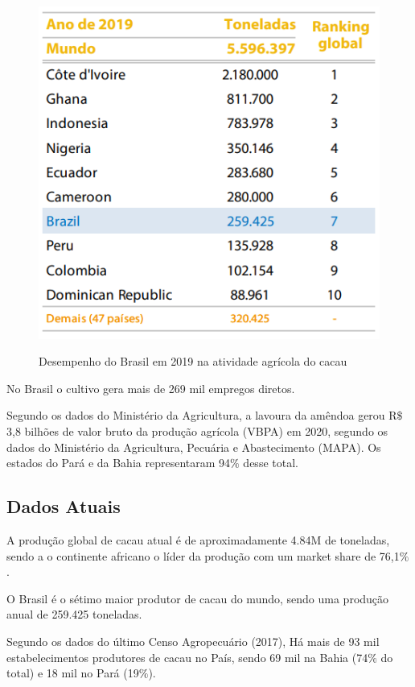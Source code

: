 \documentclass[
	12pt,				%
	openright,			%
	oneside,			%
	a4paper,			%
	english,			%
	french,				%
	spanish,			%
	brazil				%
	]{abntex2}
\begin{document}
\begin{figure}[H]
\begin{center}
\caption{Desempenho do Brasil em 2019 na atividade agrícola do cacau}
\includegraphics[scale=0.8]{../../Pictures/tabela.png} 
\label{fig2}
\end{center}
\end{figure}

No Brasil o cultivo gera mais de 269 mil empregos diretos.

Segundo os dados do Ministério da Agricultura, a lavoura da amêndoa gerou R$\$$ 3,8 bilhões de valor bruto da produção agrícola (VBPA) em 2020, segundo os dados do Ministério da Agricultura, Pecuária e Abastecimento (MAPA). Os estados do Pará e da Bahia representaram 94$\%$ desse total. \cite{8}

\subsection{Dados Atuais}

A produção global de cacau atual é de aproximadamente 4.84M de toneladas, sendo a o continente africano o líder da produção 	com um market share de 76,1$\%$. \cite{8}

O Brasil é o sétimo maior produtor de cacau do mundo, sendo uma produção anual de 259.425 toneladas.

Segundo os dados do último Censo Agropecuário (2017), Há mais de 93 mil estabelecimentos produtores de cacau no País, sendo 69 mil na Bahia (74$\%$ do total) e 18 mil no Pará (19$\%$). \cite{8}
\end{document}
